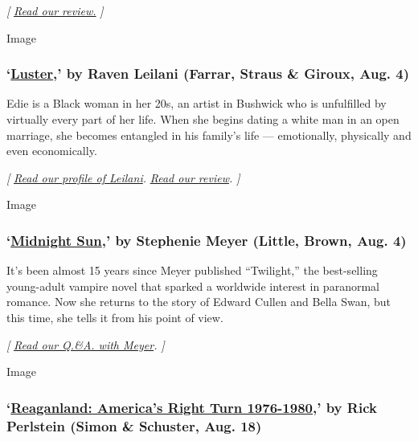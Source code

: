 \emph{{[}}
\href{https://www.nytimes3xbfgragh.onion/2020/08/04/books/review/life-of-a-klansman-edward-ball.html}{\emph{Read
our review.}} \emph{{]}}

Image

\hypertarget{luster-by-raven-leilani-farrar-straus--giroux-aug-4}{%
\subsubsection{\texorpdfstring{`\href{https://us.macmillan.com/books/9780374910334}{Luster},'
by Raven Leilani (Farrar, Straus \& Giroux, Aug.
4)}{`Luster,' by Raven Leilani (Farrar, Straus \& Giroux, Aug. 4)}}\label{luster-by-raven-leilani-farrar-straus--giroux-aug-4}}

Edie is a Black woman in her 20s, an artist in Bushwick who is
unfulfilled by virtually every part of her life. When she begins dating
a white man in an open marriage, she becomes entangled in his family's
life --- emotionally, physically and even economically.

\emph{{[}}
\href{https://www.nytimes3xbfgragh.onion/2020/07/31/books/raven-leilani-luster.html}{\emph{Read
our profile of Leilani}}\emph{. \textbar{}}
\href{https://www.nytimes3xbfgragh.onion/2020/08/04/books/review-luster-raven-leilani.html}{\emph{Read
our review}}\emph{. {]}}

Image

\hypertarget{midnight-sun-by-stephenie-meyer-little-brown-aug-4}{%
\subsubsection{\texorpdfstring{`\href{https://www.hachettebookgroup.com/titles/stephenie-meyer/midnight-sun/9780316592253/}{Midnight
Sun},' by Stephenie Meyer (Little, Brown, Aug.
4)}{`Midnight Sun,' by Stephenie Meyer (Little, Brown, Aug. 4)}}\label{midnight-sun-by-stephenie-meyer-little-brown-aug-4}}

It's been almost 15 years since Meyer published ``Twilight,'' the
best-selling young-adult vampire novel that sparked a worldwide interest
in paranormal romance. Now she returns to the story of Edward Cullen and
Bella Swan, but this time, she tells it from his point of view.

\emph{{[}}
\href{https://www.nytimes3xbfgragh.onion/2020/08/03/books/midnight-sun-stephenie-meyer-twilight.html}{\emph{Read
our Q.\&A. with Meyer}}\emph{. {]}}

Image

\hypertarget{reaganland-americas-right-turn-1976-1980-by-rick-perlstein-simon--schuster-aug-18}{%
\subsubsection{\texorpdfstring{`\href{https://www.simonandschuster.com/books/Reaganland/Rick-Perlstein/9781476793054}{Reaganland:
America's Right Turn 1976-1980},' by Rick Perlstein (Simon \& Schuster,
Aug.
18)}{`Reaganland: America's Right Turn 1976-1980,' by Rick Perlstein (Simon \& Schuster, Aug. 18)}}\label{reaganland-americas-right-turn-1976-1980-by-rick-perlstein-simon--schuster-aug-18}}

